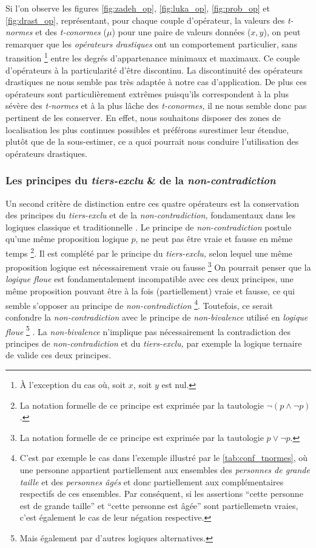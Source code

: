 Si l'on observe les figures \ref{fig:zadeh_op}, \ref{fig:luka_op},
\ref{fig:prob_op} et \ref{fig:drast_op}, représentant, pour chaque
couple d'opérateur, la valeurs des \emph{t-normes} et des
\emph{t-conormes} (\(\mu\)) pour une paire de valeurs données
(\(x,y\)), on peut remarquer que les \emph{opérateurs drastiques} ont
un comportement particulier, sans transition \footnote{À l'exception
  du cas où, soit \(x\), soit \(y\) est nul.} entre les degrés
d’appartenance minimaux et maximaux. Ce couple d'opérateurs à la
particularité d'être discontinu. La discontinuité des opérateurs
drastiques ne nous semble pas très adaptée à notre cas
d’application. De plus ces opérateurs sont particulièrement extrêmes
puisqu'ils correspondent à la plus sévère des \emph{t-normes} et à la
plus lâche des \emph{t-conormes,} il ne nous semble donc pas pertinent
de les conserver. En effet, nous souhaitons disposer des zones de
localisation les plus continues possibles et préférons surestimer leur
étendue, plutôt que de la sous-estimer, ce a quoi pourrait nous
conduire l'utilisation des opérateurs drastiques.

\subsubsection{Les principes du \emph{tiers-exclu} \& de la
  \emph{non-contradiction}}

Un second critère de distinction entre ces quatre opérateurs est la
conservation des principes du \emph{tiers-exclu} et de la
\emph{non-contradiction,} fondamentaux dans les logiques classique et
traditionnelle \autocite{Horn2018}. Le principe de
\emph{non-contradiction} postule qu'une même proposition logique
\(p\), ne peut pas être vraie et fausse en même temps \footnote{La
  notation formelle de ce principe est exprimée par la tautologie
  \(\neg(p \wedge \neg p) \).}. Il est complété par le principe du
\emph{tiers-exclu,} selon lequel une même proposition logique est
nécessairement vraie ou fausse \footnote{La notation formelle de ce
  principe est exprimée par la tautologie \(p \vee \neg p\).} On
pourrait penser que la \emph{logique floue} est fondamentalement
incompatible avec ces deux principes, une même proposition pouvant
être à la fois (partiellement) vraie et fausse, ce qui semble
s'opposer au principe de \emph{non-contradiction} \footnote{C'est par
  exemple le cas dans l'exemple illustré par le
  \autoref{tab:conf_tnormes}, où une personne appartient partiellement
  aux ensembles des \emph{personnes de grande taille} et des
  \emph{personnes âgés} et donc partiellement aux complémentaires
  respectifs de ces ensembles. Par conséquent, si les assertions
  \enquote{cette personne est de grande taille} et \enquote{cette
    personne est âgée} sont partiellemetn vraies, c'est également le
  cas de leur négation respective.}. Toutefois, ce serait confondre la
\emph{non-contradiction} avec le principe de \emph{non-bivalence}
utilisé en \emph{logique floue} \footnote{Mais également par d'autres
  logiques alternatives.} \autocite{Gottwald2020}. La
\emph{non-bivalence} n'implique pas nécessairement la contradiction
des principes de \emph{non-contradiction} et du \emph{tiers-exclu,}
par exemple la logique ternaire de  valide ces deux
principes.

